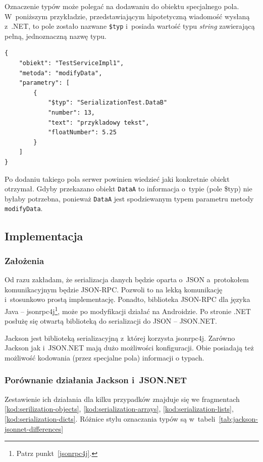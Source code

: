 Oznaczenie typów może polegać na dodawaniu do obiektu specjalnego pola. W~poniższym przykładzie, przedstawiającym hipotetyczną wiadomość wysłaną z~.NET, to pole zostało nazwane \texttt{\$typ} i~posiada wartość typu \emph{string} zawierającą pełną, jednoznaczną nazwę typu.
\begin{lstlisting}[frame=single]
{
    "obiekt": "TestServiceImpl1",
    "metoda": "modifyData",
    "parametry": [
        {
            "$typ": "SerializationTest.DataB"
            "number": 13,
            "text": "przykladowy tekst",
            "floatNumber": 5.25
        }
    ]
}
\end{lstlisting}

Po dodaniu takiego pola serwer powinien wiedzieć jaki konkretnie obiekt otrzymał.
Gdyby przekazano obiekt \texttt{DataA} to informacja o~typie (pole \$typ) nie byłaby potrzebna, ponieważ \texttt{DataA} jest spodziewanym typem parametru metody \texttt{modifyData}.


\subsection{Implementacja}
\subsubsection{Założenia}
Od razu zakładam, że serializacja danych będzie oparta o~JSON a~protokołem komunikacyjnym będzie JSON-RPC. Pozwoli to na lekką komunikację i~stosunkowo prostą implementację.
Ponadto, biblioteka JSON-RPC dla języka Java -- jsonrpc4j\footnote{Patrz punkt~\ref{jsonrpc4j}.}, może po modyfikacji działać na Androidzie.
Po stronie .NET posłużę się otwartą biblioteką do serializacji do JSON -- JSON.NET.

Jackson jest biblioteką serializacyjną z~której korzysta jsonrpc4j. Zarówno Jackson jak i~JSON.NET mają dużo możliwości konfiguracji. Obie posiadają też możliwość kodowania (przez specjalne pola) informacji o typach.

\subsubsection{Porównanie działania Jackson i~JSON.NET}
Zestawienie ich działania dla kilku przypadków znajduje się we fragmentach \ref{kod:serilization-objects}, \ref{kod:serialization-arrays}, \ref{kod:serialization-lists}, \ref{kod:serialization-dicts}. Różnice stylu oznaczania typów są w~tabeli~\ref{tab:jackson-jsonnet-differences}

